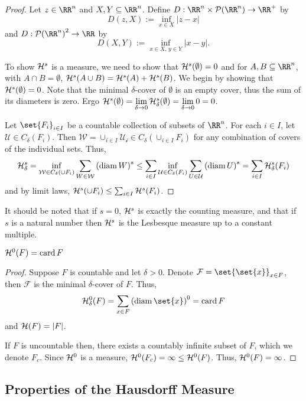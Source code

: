 \begin{proof}
	Let $z\in\RR^n$ and $X, Y\subseteq\RR^n$.
	Define $D:\RR^n\times\mathcal{P}(\RR^n)\rightarrow\RR^+$ by
	\[
		D(z,X) := \inf_{x\in X} |z-x|
	\]
	and $D:{\mathcal{P}(\RR^n)}^2\rightarrow\RR$ by
	\[
		D(X,Y) := \inf_{x\in X,\, y\in Y} |x-y|.
	\]

	To show $\mathcal{H}^s$ is a measure, we need to show that $\mathcal{H}^s(\emptyset)=0$ and for $A,B\subseteq\RR^n$, with $A\cap B=\emptyset$, $\mathcal{H}^s(A\cup B)=\mathcal{H}^s(A)+\mathcal{H}^s(B)$.
	We begin by showing that $\mathcal{H}^s(\emptyset)=0$.
	Note that the minimal $\delta$-cover of $\emptyset$ is an empty cover, thus the sum of its diameters is zero.
	Ergo $\mathcal{H}^s(\emptyset)=\lim\limits_{\delta\rightarrow 0} \mathcal{H}^s_\delta(\emptyset)=\lim\limits_{\delta\rightarrow 0} 0 =0$.

	Let $\set{F_i}_{i\in I}$ be a countable collection of subsets of $\RR^n$.
	For each $i\in I$, let $\mathcal{U}\in C_\delta(F_i)$.
	Then $\mathcal{W}=\cup_{i\in I} \mathcal{U_i}\in C_\delta(\cup_{i\in I} F_i)$ for any combination of covers of the individual sets.
	Thus,
	\[
		\mathcal{H}^s_\delta
		= \inf_{\mathcal{W}\in C_\delta(\cup F_i)} \sum_{W\in\mathcal{W}}{(\operatorname{diam} W)}^s
		\leq \sum_{i\in I} \inf_{\mathcal{U}\in C_\delta(F_i)}\sum_{U\in\mathcal{U}} {(\operatorname{diam} U)}^s
		=\sum_{i\in I} \mathcal{H}^s_\delta(F_i)
	\]
	and by limit laws, $\mathcal{H}^s(\cup F_i)\leq \sum_{i\in I} \mathcal{H}^s(F_i)$.
\end{proof}

It should be noted that if $s=0$, $\mathcal{H}^s$ is exactly the counting measure, and that if $s$ is a natural number then $\mathcal{H}^s$ is the Lesbesque measure up to a constant multiple.

\begin{thm}
	$\mathcal{H}^0(F)=\operatorname{card} F$
\end{thm}
\begin{proof}
	Suppose $F$ is countable and let $\delta>0$.
	Denote $\mathcal{F}=\set{\set{x}}_{x\in F}$, then $\mathcal{F}$ is the minimal $\delta$-cover of $F$.
	Thus,
	\[
		\hm^0_\delta(F)=\sum_{x\in F} {(\diam\set{x})}^0=\card F
	\]
	and $\mathcal{H}(F)=|F|$.

	If $F$ is uncountable then, there exists a countably infinite subset of $F$, which we denote $F_c$.
	Since $\mathcal{H}^0$ is a measure, $\mathcal{H}^0(F_c)=\infty\leq\mathcal{H}^0(F)$.
	Thus, $\mathcal{H}^0(F)=\infty$.
\end{proof}

\subsection{Properties of the Hausdorff Measure}

